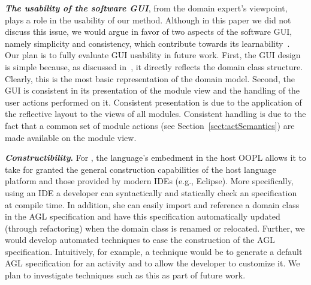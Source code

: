 \textbf{\textit{The usability of the software GUI}}, from the domain expert's viewpoint, plays a role in the usability of our method. Although in this paper we did not discuss this issue, we would argue in favor of two aspects of the software GUI, namely simplicity and consistency, which contribute towards its learnability~\cite{folmer_architecting_2004}. Our plan is to fully evaluate GUI usability in future work. First, the GUI design is simple because, as discussed in~\cite{le_domain_2018}, it directly reflects the domain class structure. Clearly, this is the most basic representation of the domain model. Second, the GUI is consistent in its presentation of the module view and the handling of the user actions performed on it. Consistent presentation is due to the application of the reflective layout to the views of all modules. Consistent handling is due to the fact that a common set of module actions (see Section~\ref{sect:actSemantics}) are made available on the module view.

\label{sect:eval-construct}

\textbf{\textit{Constructibility}.} For \agl, the language's embedment in the host OOPL allows it to take for granted the general construction capabilities of the host language platform and those provided by modern IDEs (e.g., Eclipse). More specifically, using an IDE a developer can syntactically and statically check an \agl specification at compile time. In addition, she can easily import and reference a domain class in the AGL specification and have this specification automatically updated (through refactoring) when the domain class is renamed or relocated.
%
%
Further, we would develop automated techniques to ease the construction of the AGL specification. Intuitively, for example, a technique would be to generate a default AGL specification for an activity and to allow the developer to customize it. We plan to investigate techniques such as this as part of future work.

